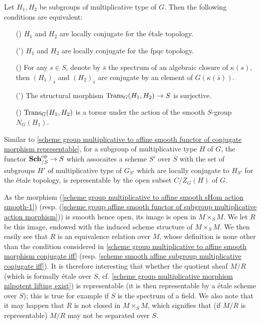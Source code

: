 \begin{corollary}\label{scheme smooth affine subgroup multiplicative conjugate iff}
Let $H_1,H_2$ be subgroups of multiplicative type of $G$. Then the following conditions are equivalent:
\begin{enumerate}
    \item[(\rmnum{1})] $H_1$ and $H_2$ are locally conjugate for the \'etale topology.
    \item[(\rmnum{1}')] $H_1$ and $H_2$ are locally conjugate for the fpqc topology.
    \item[(\rmnum{2})] For any $s\in S$, denote by $\bar{s}$ the spectrum of an algebraic closure of $\kappa(s)$, then $(H_1)_{\bar{s}}$ and $(H_2)_{\bar{s}}$ are conjugate by an element of $G(\kappa(\bar{s}))$.
    \item[(\rmnum{2}')] The structural morphism $\mathrm{Trans}_G(H_1,H_2)\to S$ is surjective.
    \item[(\rmnum{3})] $\mathrm{Trans}_G(H_1,H_2)$ is a torsor under the action of the smooth $S$-group $N_G(H_1)$.
\end{enumerate}
\end{corollary}

\begin{remark}\label{scheme smooth affine subgroup multiplicative functor of conjugate representable}
Similar to \cref{scheme group multiplicative to affine smooth functor of conjugate morphism representable}, for a subgroup of multiplicative type $H$ of $G$, the functor $\mathbf{Sch}_{/S}^{\mathrm{op}}\to S$ which assocaites a scheme $S'$ over $S$ with the set of subgroups $H'$ of multiplicative type of $G_{S'}$ which are locally conjugate to $H_{S'}$ for the \'etale topology, is representable by the open subset $C/Z_G(H)$ of $G$.
\end{remark}

\begin{remark}
As the morphism (\ref{scheme group multiplicative to affine smooth sHom action smooth-1}) (resp. (\ref{scheme group affine smooth functor of subgroup multiplicative action morphism})) is smooth hence open, its image is open in $M\times_SM$. We let $R$ be this image, endowed with the induced scheme structure of $M\times_SM$. We then easily see that $R$ is an equivalence relation over $M$, whose definition is none other than the condition considered in \cref{scheme group multiplicative to affine smooth morphism conjugate iff} (resp. \cref{scheme smooth affine subgroup multiplicative conjugate iff}). It is therefore interesting that whether the quotient sheaf $M/R$ (which is formally \'etale over $S$, cf. \cref{scheme group multiplicative morphism nilpotent lifting exist}) is representable (it is then representable by a \'etale scheme over $S$); this is true for example if $S$ is the spectrum of a field. We also note that it may happen that $R$ is not closed in $M\times_SM$, which signifies that (if $M/R$ is representable) $M/R$ may not be separated over $S$.
\end{remark}

